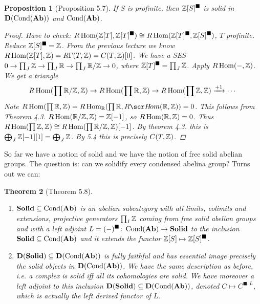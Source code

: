 \documentclass[A4paper, british]{amsart}
\theoremstyle{darkgreentheorem}
\newtheorem{thm}{Theorem}[section]
\newtheorem{prop}[thm]{Proposition}
\theoremstyle{darkbluedefinition}
\theoremstyle{darkredexample}
\theoremstyle{remark}
\DeclareMathOperator{\Hom}{Hom}
\DeclareMathOperator{\Cond}{Cond}
\newcommand{\Solid}{\mathbf{Solid}}
\newcommand{\1}{\mathbbm{1}}
\newcommand{\sub}{\subseteq}
\newcommand{\solid}{^{\blacksquare}}
\begin{document}
\begin{prop}[Proposition 5.7]
    If $S$ is profinite, then $\Z[S]\solid$ is solid in $\D(\Cond(\Ab))$ and $\Cond(\Ab)$.
    \begin{proof}
	Have to check: $R\Hom(\Z[T],\Z[T]\solid)\cong R\Hom(\Z[T]\solid,\Z[S]\solid)$, $T$ profinite.
	Reduce $\Z[S]\solid =\Z$.
	From the previous lecture we know $R\Hom(\Z[T],\Z)=R\Gamma (T,\Z)=C(T,\Z)[0]$.
	We have a SES $0\to \prod_{J}\mathbb{Z}\to \prod_{J}\mathbb{R}\to \prod_{J}\mathbb{R}/\mathbb{Z}\to 0$, where $\Z[T]\solid =\prod_{J}\Z$.
	Apply $R\Hom(-,\Z)$.
	We get a triangle
	\[R\Hom(\prod \R/\Z,\Z)\to R\Hom(\prod \R,\Z)\to R\Hom(\prod \Z,\Z)\xrightarrow{+1}\cdots\]
	Note $R\Hom(\prod \R,\Z)=R\Hom_{\R}(\prod \R, R\hom(\R,\Z))=0$.
	This follows from Theorem 4.3. $R\Hom(\R/\Z,\Z)=\Z[-1]$, so $R\Hom(\R,\Z)=0$.
	Thus $R\Hom(\prod\Z,\Z)\cong R\Hom(\prod \R/\Z,\Z)[-1]$.
	By theorem 4.3. this is $\bigoplus_{J}\mathbb{Z}[-1][1]=\bigoplus_{J}\mathbb{Z}$.
	By 5.4 this is precisely $C(T,\mathbb{Z})$.
    \end{proof}
\end{prop}

So far we have a notion of solid and we have the notion of free solid abelian groups.
The question is: can we solidify every condensed abelina group?
Turns out we can:

\begin{thm}[Theorem 5.8]
    \begin{enumerate}[label=\roman*)]
	\item $\Solid\sub \Cond(\Ab)$ is an abelian subcategory with all limits, colimits and extensions, projective generators $\prod_{I}\mathbb{Z}$ coming from free solid abelian groups and with a left adjoint $L=(-)\solid\colon \Cond(\Ab)\to \Solid$ to the inclusion $\Solid \sub \Cond(\Ab)$ and it extends the functor $\Z[S]\mapsto \Z[S]\solid$.
	\item $\D(\Solid)\sub \D(\Cond(\Ab))$ is fully faithful and has essential image precisely the solid objects in $\D(\Cond(\Ab))$.
	    We have the same description as before, i.e. a complex is solid iff all its cohomologies are solid.
	    We have moreover a left adjoint to this inclusion $\D(\Solid)\sub \D(\Cond(\Ab))$, denoted $C\mapsto C^{\blacksquare, L}$, which is actually the left derived functor of $L$.
    \end{enumerate}
\end{thm}
\end{document}

